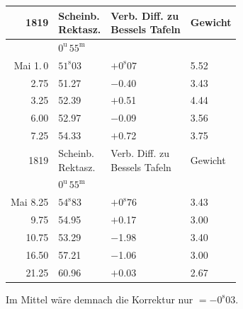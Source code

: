\begin{center}
\begin{tabular}{r|l|l|l}
1819  &  \shortstack{Scheinb.\\Rektasz.}  &  \shortstack{Verb. Diff. zu\\Bessels Tafeln}  &  Gewicht  \\
\hline
 &  $0^{\mathrm u}\,55^{\mathrm m}$  &   &   \\
Mai 1.\,0  &  $51^{\mathrm s}03$  &  $+0^{\mathrm s}07$  &  5.52  \\
2.75  &  51.27  &  $-$0.40  &  3.43  \\
3.25  &  52.39  &  $+$0.51  &  4.44  \\
6.00  &  52.97  &  $-$0.09  &  3.56  \\
7.25  &  54.33  &  $+$0.72  &  3.75  \\
\hline
 1819  &  \shortstack{Scheinb.\\Rektasz.}  &  \shortstack{Verb. Diff. zu\\Bessels Tafeln}  &  Gewicht  \\
\hline
  &  $0^{\mathrm u}\,55^{\mathrm m}$  &   &   \\
 Mai 8.25  &  $54^{\mathrm s}83$  &  $+0^{\mathrm s}76$  &  3.43  \\
 9.75  &  54.95  &  $+$0.17  &  3.00  \\
 10.75  &  53.29  &  $-$1.98  &  3.40  \\
 16.50  &  57.21  &  $-$1.06  &  3.00  \\
 21.25  &  60.96  &  $+$0.03  &  2.67  \\
\end{tabular}
\end{center}

Im Mittel wäre demnach die Korrektur nur $= -0^{\mathrm s}03$.

